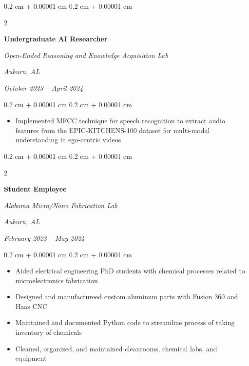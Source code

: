 \documentclass[10pt, letterpaper]{article}
\newenvironment{highlights}{
    \begin{itemize}[
        topsep=0.10 cm,
        parsep=0.10 cm,
        partopsep=0pt,
        itemsep=0pt,
        leftmargin=0.4 cm + 10pt
    ]
}{
    \end{itemize}
} %
\newenvironment{onecolentry}{
    \begin{adjustwidth}{
        0.2 cm + 0.00001 cm
    }{
        0.2 cm + 0.00001 cm
    }
}{
    \end{adjustwidth}
} %
\newenvironment{twocolentry}[2][]{
    \onecolentry
    \def\secondColumn{#2}
    \setcolumnwidth{\fill, 4.5 cm}
    \begin{paracol}{2}
}{
    \switchcolumn \raggedleft \secondColumn
    \end{paracol}
    \endonecolentry
} %
\begin{document}
        \vspace{0.2 cm}

        \begin{twocolentry}{
        \textit{Auburn, AL}    
            
        \textit{October 2023 – April 2024}}
            \textbf{Undergraduate AI Researcher}
            
            \textit{Open-Ended Reasoning and Knowledge Acquisition Lab}
        \end{twocolentry}

        \vspace{0.10 cm}
        \begin{onecolentry}
            \begin{highlights}
                \item Implemented MFCC technique for speech recognition to extract audio features from the EPIC-KITCHENS-100 dataset for multi-modal understanding in ego-centric videos
            \end{highlights}
        \end{onecolentry}

        \vspace{0.2 cm}

        \begin{twocolentry}{
        \textit{Auburn, AL}    
            
        \textit{February 2023 – May 2024}}
            \textbf{Student Employee}
            
            \textit{Alabama Micro/Nano Fabrication Lab}
        \end{twocolentry}

        \vspace{0.10 cm}
        \begin{onecolentry}
            \begin{highlights}
                \item Aided electrical engineering PhD students with chemical processes related to microelectronics fabrication
                \item Designed and manufactureed custom aluminum parts with Fusion 360 and Haas CNC
                \item Maintained and documented Python code to streamline process of taking inventory of chemicals
                \item Cleaned, organized, and maintained cleanrooms, chemical labs, and equipment
            \end{highlights}
        \end{onecolentry}
\end{document}
